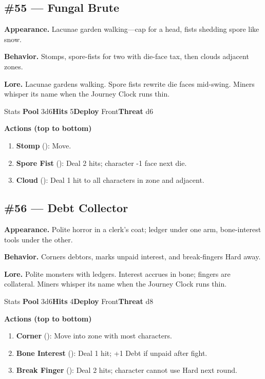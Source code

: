 \subsection*{\#55 --- Fungal Brute}

\textbf{Appearance.} Lacunae garden walking---cap for a head, fists shedding spore like snow.

\textbf{Behavior.} Stomps, spore-fists for two with die-face tax, then clouds adjacent zones.

\textbf{Lore.} Lacunae gardens walking. Spore fists rewrite die faces mid-swing. Miners whisper its name when the Journey Clock runs thin.

\begin{monsterentry}{Stats}
\textbf{Pool} 3d6\quad\textbf{Hits} 5\quad\textbf{Deploy} Front\quad\textbf{Threat} d6

\textbf{Actions (top to bottom)}
\begin{enumerate}\setlength{\itemsep}{0.15em}\setlength{\parskip}{0pt}
  \item \textbf{Stomp} (\easy): Move.
  \item \textbf{Spore Fist} (\medium): Deal 2 hits; character -1 face next die.
  \item \textbf{Cloud} (\hard): Deal 1 hit to all characters in zone and adjacent.
\end{enumerate}
\end{monsterentry}

\subsection*{\#56 --- Debt Collector}

\textbf{Appearance.} Polite horror in a clerk's coat; ledger under one arm, bone-interest tools under the other.

\textbf{Behavior.} Corners debtors, marks unpaid interest, and break-fingers Hard away.

\textbf{Lore.} Polite monsters with ledgers. Interest accrues in bone; fingers are collateral. Miners whisper its name when the Journey Clock runs thin.

\begin{monsterentry}{Stats}
\textbf{Pool} 3d6\quad\textbf{Hits} 4\quad\textbf{Deploy} Front\quad\textbf{Threat} d8

\textbf{Actions (top to bottom)}
\begin{enumerate}\setlength{\itemsep}{0.15em}\setlength{\parskip}{0pt}
  \item \textbf{Corner} (\easy): Move into zone with most characters.
  \item \textbf{Bone Interest} (\medium): Deal 1 hit; +1 Debt if unpaid after fight.
  \item \textbf{Break Finger} (\hard): Deal 2 hits; character cannot use Hard next round.
\end{enumerate}
\end{monsterentry}

